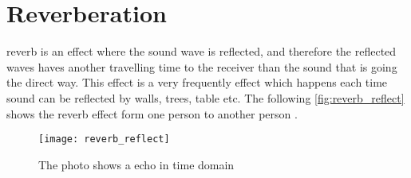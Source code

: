 \section{Reverberation}
\gls{reverb} is an effect where the sound wave is reflected, and therefore the reflected waves haves another travelling time to the receiver than the sound that is going the direct way. This effect is a very frequently effect which happens each time sound can be reflected by walls, trees, table etc. The following \autoref{fig:reverb_reflect} shows the \gls{reverb} effect form one person to another person \citep{reverb_expl}.

\begin{figure} [htbp]
 \centering
  \texttt{[image: reverb\_reflect]}
  \caption{The photo shows a echo in time domain}
  \label{fig:reverb_reflect}
\end{figure}



